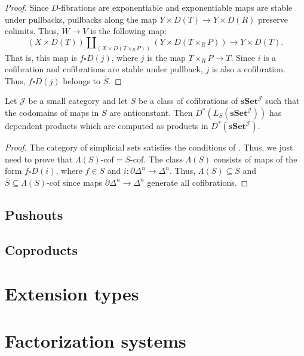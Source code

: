 \documentclass[reqno]{amsart}
\theoremstyle{definition}
\theoremstyle{remark}
\newcommand{\cat}[1]{\mathbf{#1}}
\newcommand{\scat}[1]{\mathcal{#1}}
\newcommand{\sSet}{\cat{sSet}}
\newcommand{\class}[2]{#1\text{-}\mathrm{#2}}
\newcommand{\I}{\mathrm{I}}
\newcommand{\Icof}[1][\I]{\class{#1}{cof}}
\numberwithin{figure}{section}
\begin{document}
\begin{proof}
Since $D$-fibrations are exponentiable and exponentiable maps are stable under pullbacks, pullbacks along the map $Y \times D(T) \to Y \times D(R)$ preserve colimits.
Thus, $W \to V$ is the following map:
\[ (X \times D(T)) \amalg_{(X \times D(T \times_R P))} (Y \times D(T \times_R P)) \to Y \times D(T). \]
That is, this map is $f \square D(j)$, where $j$ is the map $T \times_R P \to T$.
Since $i$ is a cofibration and cofibrations are stable under pullback, $j$ is also a cofibration.
Thus, $f \square D(j)$ belongs to $\overline{S}$.
\end{proof}

\begin{cor}
Let $\scat{J}$ be a small category and let $S$ be a class of cofibrations of $\sSet^\scat{J}$ such that the codomains of maps in $S$ are anticonstant.
Then $D^*(L_S(\sSet^\scat{J}))$ has dependent products which are computed as products in $D^*(\sSet^\scat{J})$.
\end{cor}
\begin{proof}
The category of simplicial sets satisfies the conditions of .
Thus, we just need to prove that $\Icof[\Lambda(S)] = \Icof[\overline{S}]$.
The class $\Lambda(S)$ consists of maps of the form $f \square D(i)$, where $f \in S$ and $i : \partial \Delta^n \to \Delta^n$.
Thus, $\Lambda(S) \subseteq \overline{S}$ and $\overline{S} \subseteq \Icof[\Lambda(S)]$ since maps $\partial \Delta^n \to \Delta^n$ generate all cofibrations.
\end{proof}

\subsection{Pushouts}


\subsection{Coproducts}

\section{Extension types}


\section{Factorization systems}
\end{document}
